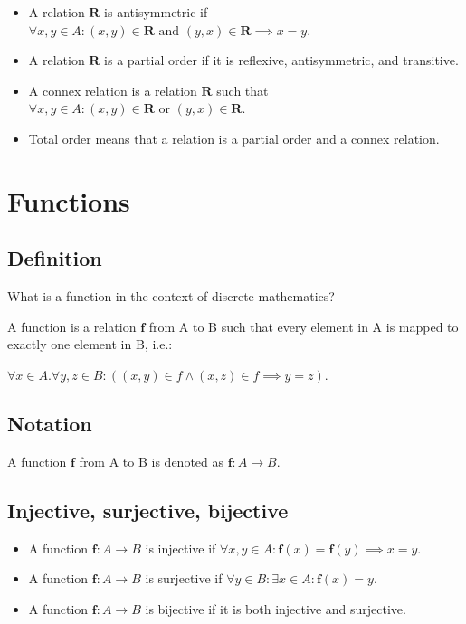 \documentclass{article}
\begin{document}
\begin{itemize}
    \item A relation $\mathbf{R}$ is antisymmetric if $\forall x, y \in A : (x, y) \in \mathbf{R} \text{ and } (y, x) \in \mathbf{R} \implies x = y$.
    \item A relation $\mathbf{R}$ is a partial order if it is reflexive, antisymmetric, and transitive.
    \item A connex relation is a relation $\mathbf{R}$ such that $\forall x, y \in A : (x, y) \in \mathbf{R} \text{ or } (y, x) \in \mathbf{R}$.
    \item Total order means that a relation is a partial order and a connex relation.
\end{itemize}
\section{Functions}

\subsection{Definition}

What is a function in the context of discrete mathematics?

A function is a relation $\mathbf{f}$ from A to B such that every element in A is mapped to exactly one element in B, i.e.:

$\forall x \in A . \forall y, z \in B : ((x, y) \in {f} \land (x, z) \in {f} \implies y = z)$.

\subsection{Notation}

A function $\mathbf{f}$ from A to B is denoted as $\mathbf{f} : A \rightarrow B$.

\subsection{Injective, surjective, bijective}

\begin{itemize}
    \item A function $\mathbf{f} : A \rightarrow B$ is injective if $\forall x, y \in A : \mathbf{f}(x) = \mathbf{f}(y) \implies x = y$.
    \item A function $\mathbf{f} : A \rightarrow B$ is surjective if $\forall y \in B : \exists x \in A : \mathbf{f}(x) = y$.
    \item A function $\mathbf{f} : A \rightarrow B$ is bijective if it is both injective and surjective.
\end{itemize}
\end{document}
